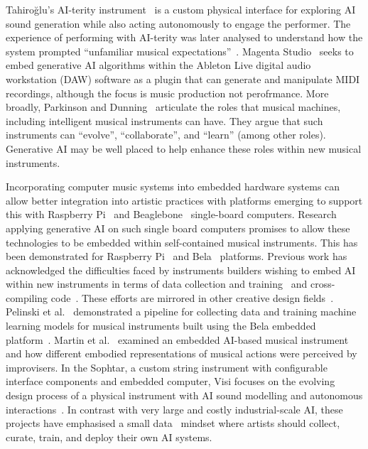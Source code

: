 \documentclass[manuscript,review,anonymous]{acmart}
\begin{document}
Tahiroğlu's AI-terity instrument~\cite{tahiroglu-aiterity-2021} is a custom physical interface for exploring AI sound generation while also acting autonomously to engage the performer. The experience of performing with AI-terity was later analysed to understand how the system prompted ``unfamiliar musical expectations''~\cite{tahirouglu-evolving-2022}.
Magenta Studio~\cite{magenta-studio-2019} seeks to embed generative AI algorithms within the Ableton Live digital audio workstation (DAW) software as a plugin that can generate and manipulate MIDI recordings, although the focus is music production not perofrmance.
More broadly, Parkinson and Dunning~\cite{taxonomy-music-interactions-parkinson-2025} articulate the roles that musical machines, including intelligent musical instruments can have. They argue that such instruments can ``evolve'', ``collaborate'', and ``learn'' (among other roles). Generative AI may be well placed to help enhance these roles within new musical instruments. 


Incorporating computer music systems into embedded hardware systems can allow better integration into artistic practices with platforms emerging to support this with Raspberry Pi~\cite{Berdahl:2013aa} and Beaglebone~\cite{mcpherson-bela-2016} single-board computers. Research applying generative AI on such single board computers promises to allow these technologies to be embedded within self-contained musical instruments. 
This has been demonstrated for Raspberry Pi~\cite{Naess:2019aa, martin_empi} and Bela~\cite{pelinski_pipeline_bela} platforms. 
Previous work has acknowledged the difficulties faced by instruments builders wishing to embed AI within new instruments in terms of data collection and training~\cite{Martin2019} and cross-compiling code~\cite{pelinski_pipeline_bela}. These efforts are  mirrored in other creative design fields~\cite{teachablemachine}.
Pelinski et al.~\cite{pelinski_pipeline_bela} demonstrated a pipeline for collecting data and training machine learning models for musical instruments built using the Bela embedded platform~\cite{mcpherson-bela-2016}.
Martin et al.~\cite{martin_empi} examined an embedded AI-based musical instrument and how different embodied representations of musical actions were perceived by improvisers.
In the Sophtar, a custom string instrument with configurable interface components and embedded computer, Visi focuses on the evolving design process of a physical instrument with AI sound modelling and autonomous interactions~\cite{visi-sophtar-2024}.
In contrast with very large and costly industrial-scale AI, these projects have emphasised a small data~\cite{Vigliensoni:2022} mindset where artists should collect, curate, train, and deploy their own AI systems. 
\end{document}
